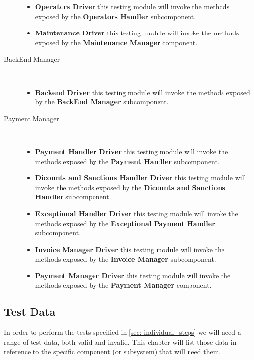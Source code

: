 \begin{description}
\begin{itemize}
				\item \textbf{Operators Driver} this testing module will invoke the methods exposed by the \textbf{Operators Handler} subcomponent.
				\item \textbf{Maintenance Driver} this testing module will invoke the methods exposed by the \textbf{Maintenance Manager} component.
			\end{itemize}	
		\item[BackEnd Manager]~\\
			\begin{itemize}
				\item \textbf{Backend Driver} this testing module will invoke the methods exposed by the \textbf{BackEnd Manager} subcomponent.
			\end{itemize}
		\item[Payment Manager]~\\ 
			\begin{itemize}
				\item \textbf{Payment Handler Driver} this testing module will invoke the methods exposed by the \textbf{Payment Handler} subcomponent.
				\item \textbf{Dicounts and Sanctions Handler Driver} this testing module will invoke the methods exposed by the \textbf{Dicounts and Sanctions Handler} subcomponent.
				\item \textbf{Exceptional Handler Driver} this testing module will invoke the methods exposed by the \textbf{Exceptional Payment Handler} subcomponent.
				\item \textbf{Invoice Manager Driver} this testing module will invoke the methods exposed by the \textbf{Invoice Manager} subcomponent.
				\item \textbf{Payment Manager Driver} this testing module will invoke the methods exposed by the \textbf{Payment Manager} component.
			\end{itemize}
		
		\end{description}
		
	
	
	
	\subsection{Test Data}
	
	In order to perform the tests specified in \autoref{sec: individual_steps} we will need a range of test data, both valid and invalid. This chapter will list those data in reference to the specific component (or subsystem) that will need them. %
	
